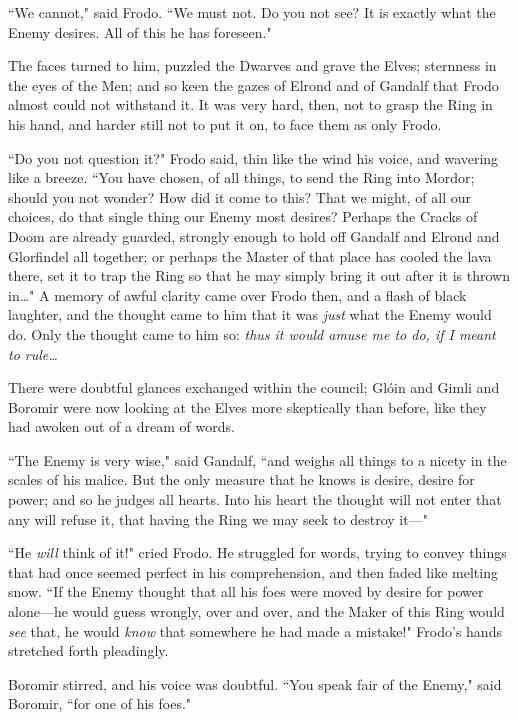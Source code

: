 ``We cannot," said Frodo. ``We must not. Do you not see? It is exactly what the Enemy desires. All of this he has foreseen."

The faces turned to him, puzzled the Dwarves and grave the Elves; sternness in the eyes of the Men; and so keen the gazes of Elrond and of Gandalf that Frodo almost could not withstand it. It was very hard, then, not to grasp the Ring in his hand, and harder still not to put it on, to face them as only Frodo.

``Do you not question it?" Frodo said, thin like the wind his voice, and wavering like a breeze. ``You have chosen, of all things, to send the Ring into Mordor; should you not wonder? How did it come to this? That we might, of all our choices, do that single thing our Enemy most desires? Perhaps the Cracks of Doom are already guarded, strongly enough to hold off Gandalf and Elrond and Glorfindel all together; or perhaps the Master of that place has cooled the lava there, set it to trap the Ring so that he may simply bring it out after it is thrown in{\ldots}" A memory of awful clarity came over Frodo then, and a flash of black laughter, and the thought came to him that it was \emph{just} what the Enemy would do. Only the thought came to him so: \emph{thus it would amuse me to do, if I meant to rule{\ldots}}

There were doubtful glances exchanged within the council; Glóin and Gimli and Boromir were now looking at the Elves more skeptically than before, like they had awoken out of a dream of words.

``The Enemy is very wise," said Gandalf, ``and weighs all things to a nicety in the scales of his malice. But the only measure that he knows is desire, desire for power; and so he judges all hearts. Into his heart the thought will not enter that any will refuse it, that having the Ring we may seek to destroy it—"

``He \emph{will} think of it!" cried Frodo. He struggled for words, trying to convey things that had once seemed perfect in his comprehension, and then faded like melting snow. ``If the Enemy thought that all his foes were moved by desire for power alone—he would guess wrongly, over and over, and the Maker of this Ring would \emph{see} that, he would \emph{know} that somewhere he had made a mistake!" Frodo's hands stretched forth pleadingly.

Boromir stirred, and his voice was doubtful. ``You speak fair of the Enemy," said Boromir, ``for one of his foes."

